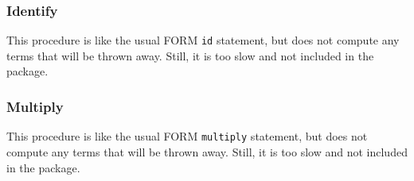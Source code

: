 \documentclass{article}
\begin{document}
\subsubsection{Identify}
\label{sec:impl_id}

This procedure is like the usual FORM {\tt id} statement, but does not
compute any terms that will be thrown away. Still, it is too slow and
not included in the package.


\subsubsection{Multiply}
\label{sec:impl_multi}

This procedure is like the usual FORM {\tt multiply} statement, but does not
compute any terms that will be thrown away. Still, it is too slow and
not included in the package.
\end{document}
